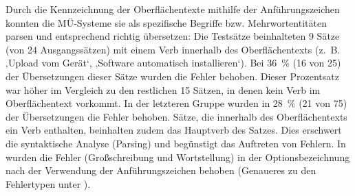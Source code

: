 \begin{figure}
\captionsetup{width=.45\textwidth}
\begin{floatrow}


%
%
\end{floatrow}
\end{figure}


Durch die Kennzeichnung der Oberflächentexte mithilfe der Anführungszeichen konnten die MÜ-Systeme sie als spezifische Begriffe bzw. Mehrwortentitäten parsen und entsprechend richtig übersetzen: Die Testsätze beinhalteten 9 Sätze (von 24 Ausgangssätzen) mit einem Verb innerhalb des Oberflächentexts (z.~B. ‚Upload vom Gerät‘, ‚Software automatisch installieren‘). Bei 36~\% (16 von 25) der Übersetzungen dieser Sätze wurden die Fehler behoben. Dieser Prozentsatz war höher im Vergleich zu den restlichen 15 Sätzen, in denen kein Verb im Oberflächentext vorkommt. In der letzteren Gruppe wurden in 28~\% (21 von 75) der Übersetzungen die Fehler behoben. Sätze, die innerhalb des Oberflächentexts ein Verb enthalten, beinhalten zudem das Hauptverb des Satzes. Dies erschwert die syntaktische Analyse (Parsing) und begünstigt das Auftreten von Fehlern. In  wurden die Fehler (Großschreibung und Wortstellung) in der Optionsbezeichnung nach der Verwendung der Anführungszeichen behoben (Genaueres zu den Fehlertypen unter ).


